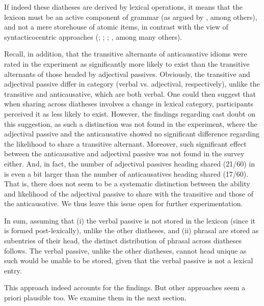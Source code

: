 \documentclass[output=paper]{langsci/langscibook}
\begin{document}
If indeed these diatheses are derived by lexical operations, it means that the
lexicon must be an active component of grammar (as argued by
\citealt{Reinhart2002}, \citealt{Siloni2002} among others), and not a mere
storehouse of atomic items, in contrast with the view of syntacticocentric
approaches (\citealt{Borer2005}; \citealt{Marantz1997};
\citealt{Pylkkanen2008}; \citealt{Ramchand2008}, among many others).

Recall, in addition, that the transitive alternants of anticausative idioms
were rated in the  experiment as significantly more likely to exist than
the transitive alternants of those headed by adjectival passives. Obviously,
the transitive and adjectival passive differ in category (verbal vs.
adjectival, respectively), unlike the transitive and anticausative, which are
both verbal. One could then suggest that when sharing across diatheses involves
a change in lexical category, participants perceived it as less likely to
exist. However, the findings regarding  cast doubt on this
suggestion, as such a distinction was not found in the  experiment,
where the adjectival passive and the anticausative showed no significant
difference regarding the likelihood to share a transitive alternant. Moreover,
such significant effect between the anticausative and adjectival passive was
not found in the  survey either. And, in fact, the number of adjectival
passives heading shared  (21/60) in  is even a bit larger than the
number of anticausatives heading shared  (17/60). That is, there does not
seem to be a systematic distinction between the ability and likelihood of the
adjectival passive to share  with the transitive and those of the
anticausative. We thus leave this issue open for further experimentation.

In sum, assuming that (i) the verbal passive is not stored in the lexicon
(since it is formed post-lexically), unlike the other diatheses, and (ii)
phrasal  are stored as subentries of their head, the distinct
distribution of phrasal  across diatheses follows. The verbal passive,
unlike the other diatheses, cannot head unique  as such  would be
unable to be stored, given that the verbal passive is not a lexical entry.

This approach indeed accounts for the findings. But other approaches seem a
priori plausible too. We examine them in the next section.
\end{document}

